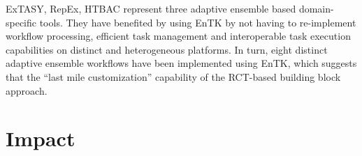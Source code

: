 \documentclass[preprint,12pt, a4paper]{elsarticle}
\begin{document}
ExTASY, RepEx, HTBAC represent three adaptive ensemble based domain-specific
tools. They have benefited by using EnTK by not having to re-implement
workflow processing, efficient task management and interoperable task
execution capabilities on distinct and heterogeneous platforms. In turn, eight
distinct adaptive ensemble workflows have been implemented using EnTK, which
suggests that the ``last mile customization'' capability of the RCT-based
building block approach.



\section{Impact}\label{sec:impact}



\end{document}
